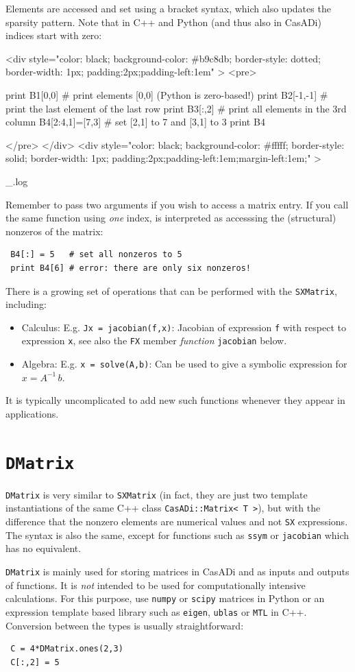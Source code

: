 \documentclass[a4paper,12pt]{book}
\newcounter{pytexcount}
\newcounter{pytexsubcount}
\renewenvironment{pytex}
{\addtocounter{pytexsubcount}{1}%
\begin{rawhtml}
<div style="color: black; background-color: \#b9c8db;  border-style: dotted; border-width: 1px; padding:2px;padding-left:1em" >
<pre>
\end{rawhtml}
}%
{\begin{rawhtml}
</pre>
</div>
<div style="color: black; background-color: \#fffff;  border-style: solid; border-width: 1px; padding:2px;padding-left:1em;margin-left:1em;" >\end{rawhtml}
_\arabic{pytexsubcount}.log}%
\begin{rawhtml}
</div>
\end{rawhtml}
}
\begin{document}
{Elements are accessed and set using a bracket syntax, which also updates the sparsity pattern. Note that in C++ and Python (and thus also in CasADi) indices start with zero:
\begin{pytex} 
print B1[0,0]   # print elements [0,0] (Python is zero-based!)
print B2[-1,-1] # print the last element of the last row
print B3[:,2]   # print all elements in the 3rd column
B4[2:4,1]=[7,3] # set [2,1] to 7 and [3,1] to 3
print B4
\end{pytex}

Remember to pass two arguments if you wish to access a matrix entry. If you call the same function using \emph{one} index, is interpreted as accesssing the (structural) nonzeros of the matrix:
\begin{verbatim}
 B4[:] = 5   # set all nonzeros to 5
 print B4[6] # error: there are only six nonzeros!
\end{verbatim}

There is a growing set of operations that can be performed with the \texttt{SXMatrix}, including:
\begin{itemize}
 \item Calculus: E.g. \verb|Jx = jacobian(f,x)|: Jacobian of expression \texttt{f} with respect to expression \texttt{x}, see also the \texttt{FX} member \emph{function} \texttt{jacobian} below.
 \item Algebra: E.g. \verb|x = solve(A,b)|: Can be used to give a symbolic expression for $x = A^{-1} \, b$.
\end{itemize}
It is typically uncomplicated to add new such functions whenever they appear in applications.

\section{\texttt{DMatrix}}
\texttt{DMatrix} is very similar to \texttt{SXMatrix} (in fact, they are just two template instantiations of the same C++ class \texttt{CasADi::Matrix<\,T\,>}), but with the difference that the nonzero elements are numerical values and not \texttt{SX} expressions. The syntax is also the same, except for functions such as \texttt{ssym} or \texttt{jacobian} which has no equivalent.

\texttt{DMatrix} is mainly used for storing matrices in CasADi and as inputs and outputs of functions. It is \emph{not} intended to be used for computationally intensive calculations. For this purpose, use \texttt{numpy} or \texttt{scipy} matrices in Python or an expression template based library such as \texttt{eigen}, \texttt{ublas} or \texttt{MTL} in C++. Conversion between the types is usually straightforward:
\begin{verbatim}
 C = 4*DMatrix.ones(2,3)
 C[:,2] = 5


\end{verbatim}}
\end{document}
